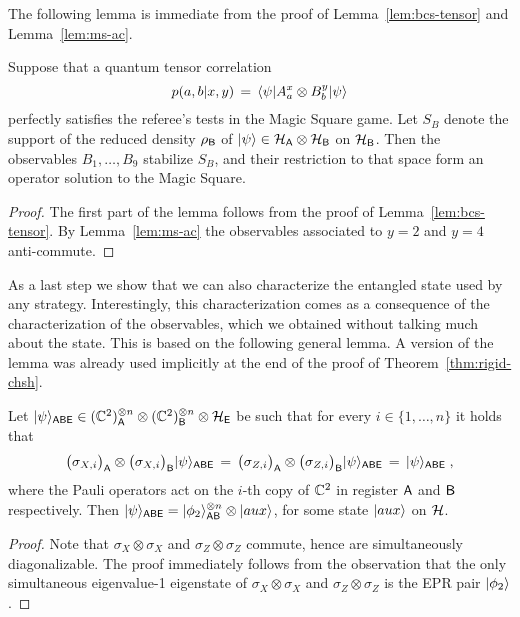 The following lemma is immediate from the proof of Lemma~\ref{lem:bcs-tensor} and Lemma~\ref{lem:ms-ac}.  

\begin{lemma}\label{lem:ms-perfect}
Suppose that a quantum tensor correlation
\[ p(a,b|x,y)\,=\, \langle\psi| A^x_a \otimes B^y_b|\psi\rangle\]
  perfectly satisfies the referee's tests in the Magic Square game. Let $S_B$ denote the support of the reduced density $\rho_{\textsf{B}}$ of $|\psi\rangle\in\mathcal{H}_{\textsf{A}}\otimes \mathcal{H}_{\textsf{B}}$ on $\mathcal{H}_{\textsf{B}}$.  Then the observables $B_1,\ldots,B_9$ stabilize $S_B$, and their restriction to that space form an operator solution to the Magic Square.
\end{lemma}

\begin{proof}
The first part of the lemma follows from the proof of Lemma~\ref{lem:bcs-tensor}. By Lemma~\ref{lem:ms-ac} the observables associated to $y=2$ and $y=4$ anti-commute. 
\end{proof}


As a last step we show that we can also characterize the entangled state used by any strategy. Interestingly, this characterization comes as a consequence of the characterization of the observables, which we obtained without talking much about the state. This is based on the following general lemma. A version of the lemma was already used implicitly at the end of the proof of Theorem~\ref{thm:rigid-chsh}.

\begin{lemma}\label{lem:epr-stable}
Let $|\psi\rangle_{{\textsf{ABE}}} \in (\mathbb{C}^2)_{\textsf{A}}^{\otimes n} \otimes (\mathbb{C}^2)_{\textsf{B}}^{\otimes n} \otimes \mathcal{H}_{\textsf{E}}$ be such that for every $i\in \{1,\ldots, n\}$ it holds that 
\[\big(\sigma_{X,i}\big)_{\textsf{A}} \otimes \big(\sigma_{X,i}\big)_{\textsf{B}} |\psi\rangle_{{\textsf{ABE}}} \,=\, \big(\sigma_{Z,i}\big)_{\textsf{A}} \otimes \big(\sigma_{Z,i}\big)_{\textsf{B}} |\psi\rangle_{{\textsf{ABE}}} \,=\,|\psi\rangle_{\textsf{ABE}}\;,\]
where the Pauli operators act on the $i$-th copy of $\mathbb{C}^2$ in register ${\textsf{A}}$ and ${\textsf{B}}$ respectively. Then $|\psi\rangle_{{\textsf{ABE}}} = |\phi_2\rangle^{\otimes n}_{{\textsf{AB}}} \otimes |aux\rangle$, for some state $|aux\rangle$ on $\mathcal{H}$. 
\end{lemma}

\begin{proof}
Note that $\sigma_X\otimes \sigma_X$ and $\sigma_Z\otimes \sigma_Z$ commute, hence are simultaneously diagonalizable. 
The proof immediately follows from the observation that the only simultaneous eigenvalue-1 eigenstate of $\sigma_X\otimes \sigma_X$ and $\sigma_Z\otimes \sigma_Z$ is the EPR pair $|\phi_2\rangle$. 
\end{proof}

